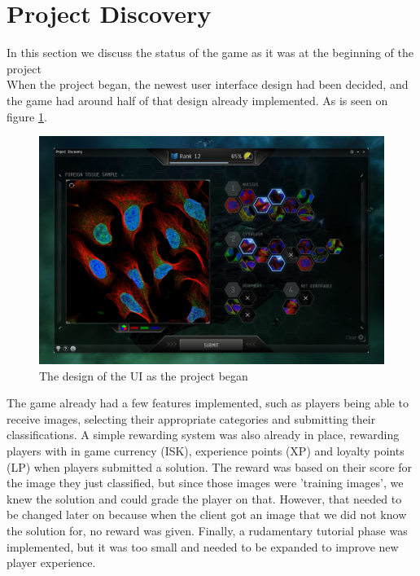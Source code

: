 \section{Project Discovery}\label{sec:project_discovery}
In this section we discuss the status of the game as it was at the beginning of the project\\

When the project began, the newest user interface design had been decided, and the game had around half of that design already implemented. As is seen on figure \ref{fig:PD}.

\begin{figure}[H]
	\centering
	\graphicspath{ {./graphics/} }
    \centerline{\includegraphics[scale=0.35]{PD.png}}
    \caption{\label{fig:PD}The design of the UI as the project began}
\end{figure}
\clearpage

The game already had a few features implemented, such as players being able to receive images, selecting their appropriate categories and submitting their classifications. A simple rewarding system was also already in place, rewarding players with in game currency (ISK), experience points (XP) and loyalty points (LP) when players submitted a solution. The reward was based on their score for the image they just classified, but since those images were 'training images', we knew the solution and could grade the player on that. However, that needed to be changed later on because when the client got an image that we did not know the solution for, no reward was given. Finally, a rudamentary tutorial phase was implemented, but it was too small and needed to be expanded to improve new player experience.\\


